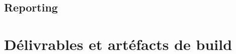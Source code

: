 \documentclass{report}
\begin{document}
        \subsection{Reporting}

      \section{Délivrables et artéfacts de build}

  \listoffigures                  %
\end{document}
